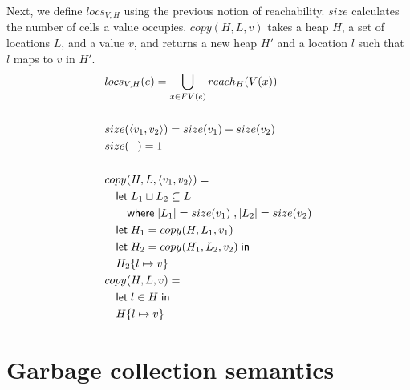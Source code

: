 \documentclass[11pt]{article}
\begin{document}
\noindent
Next, we define $locs_{V,H}$ using the previous notion of reachability. $size$ calculates the number of cells a value occupies. $copy(H,L,v)$ takes a heap $H$, a set of locations $L$, and a value $v$, and returns a new heap $H'$ and a location $l$ such that $l$ maps to $v$ in $H'$.
\begin{align*}
  &locs_{V,H}(e) = \bigcup\limits_{x \in FV(e)} reach_H(V(x))\\\\
  &size(\langle v_1, v_2\rangle) = size(v_1) + size(v_2)\\
  &size(\_) = 1\\\\
  &copy(H,L,\langle v_1, v_2\rangle) =\\
  &\quad\mathsf{let }\; L_1 \sqcup L_2 \subseteq L\\
  &\quad\quad\mathsf{ where }\; |L_1| = size(v_1) \;,|L_2| = size(v_2)\\
  &\quad\mathsf{let }\; H_1 = copy(H,L_1,v_1) \\
  &\quad\mathsf{let }\; H_2 = copy(H_1,L_2,v_2) \;\mathsf{in}\\
  &\quad H_2\{l \mapsto v\}\\
  &copy(H,L,v) =\\
  &\quad\mathsf{let }\; l \in H\; \mathsf{in}\\
  &\quad H\{l \mapsto v\}\\
\end{align*}

\section{Garbage collection semantics}
\end{document}
